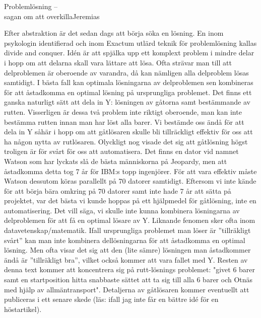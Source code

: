 \documentclass{spektraklet}
\begin{document}
\begin{artikel}{Problemlösning – \\ sagan om att overkilla}{Jeremias}
\begin{twocolumns}
Efter abstraktion är det sedan dags att börja söka en lösning. En inom psykologin identifierad och inom Exactum utlärd teknik för problemlösning kallas divide and conquer. Idén är att spjälka upp ett komplext problem i mindre delar i hopp om att delarna skall vara lättare att lösa. Ofta strävar man till att delproblemen är oberoende av varandra, då kan nämligen alla delproblem lösas samtidigt.  I bästa fall kan optimala lösningarna av delproblemen sen kombineras för att åstadkomma en optimal lösning på ursprungliga problemet. Det finns ett ganska naturligt sätt att dela in Y: lösningen av gåtorna samt bestämmande av rutten. Visserligen är dessa två problem inte riktigt oberoende, man kan inte bestämma rutten innan man har löst alla barer. Vi bestämde oss ändå för att dela in Y såhär i hopp om att gåtlösaren skulle bli tillräckligt effektiv för oss att ha någon nytta av rutlösaren.  Olyckligt nog visade det sig att gåtlösning högst troligen är för svårt för oss att automatisera. Det finns en dator vid namnet Watson som har  lyckats slå  de bästa människorna på Jeopardy, men att åstadkomma detta tog 7 år för IBM:s topp ingenjörer. För att vara effektiv måste Watson dessutom köras parallellt på 70 datorer samtidigt. Eftersom vi inte kände för att börja bära omkring på 70 datorer samt inte hade 7 år att sätta på projektet, var det bästa vi kunde hoppas på ett hjälpmedel för gåtlösning, inte en automatisering. Det vill säga, vi skulle inte kunna kombinera lösningarna av delproblemen för att få en optimal lösare av Y. Liknande fenomen sker ofta inom datavetenskap/matematik. Ifall ursprungliga problemet man löser är ”tillräkligt svårt” kan man inte kombinera dellösningarna för att åstadkomma en optimal lösning. Men ofta visar det sig att den (lite sämre) lösningen man åstadkommer ändå är ”tillräkligt bra”, vilket också kommer att vara fallet med Y. Resten av denna text kommer att koncentrera sig på rutt-lösnings problemet: "givet 6 barer samt en startposition hitta snabbaste sättet att ta sig till alla 6 barer och Otnäs med hjälp av allmäntransport". Detaljerna av gåtlösaren kommer eventuellt att publiceras i ett senare skede (läs: ifall jag inte får en bättre idé för en höstartikel).


\end{twocolumns}
\end{artikel}
\end{document}
